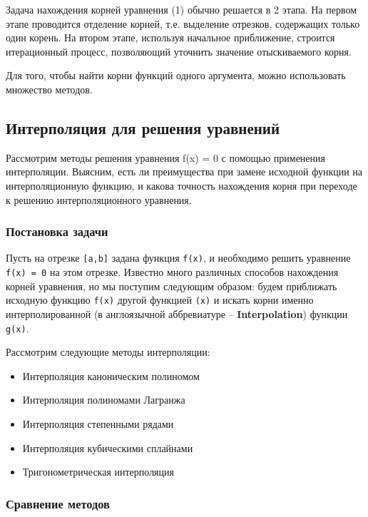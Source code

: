 \documentclass{article}
\begin{document}
	Задача нахождения корней уравнения (1) обычно решается в 2 этапа. На первом этапе проводится отделение корней, т.е. выделение отрезков, содержащих только один корень. На втором этапе, используя начальное приближение, строится итерационный процесс, позволяющий уточнить значение отыскиваемого корня.

	Для того, чтобы найти корни функций одного аргумента, можно использовать множество методов.
	
		\subsection{Интерполяция для решения уравнений}
		
			Рассмотрим методы решения уравнения f(x) = 0 с помощью применения интерполяции. Выясним, есть ли преимущества при замене исходной функции на интерполяционную функцию, и какова точность нахождения корня при переходе к решению интерполяционного уравнения.
			
			\subsubsection{Постановка задачи}
			
				Пусть на отрезке \texttt{[a,b]} задана функция \texttt{f(x)}, и необходимо решить уравнение \texttt{f(x) = 0} на этом отрезке. Известно много различных способов нахождения корней уравнения, но мы поступим следующим образом: будем приближать исходную функцию \texttt{f(x)} другой функцией \texttt{(x)} и искать корни именно интерполированной (в англоязычной аббревиатуре -- \textbf{Interpolation}) функции \texttt{g(x)}.
				
				Рассмотрим следующие методы интерполяции:
				
				\begin{itemize}
					\item Интерполяция каноническим полиномом
					\item Интерполяция полиномами Лагранжа
					\item Интерполяция степенными рядами
					\item Интерполяция кубическими сплайнами
					\item Тригонометрическая интерполяция
				\end{itemize}
				
			\subsubsection{Сравнение методов}
			
\end{document}
